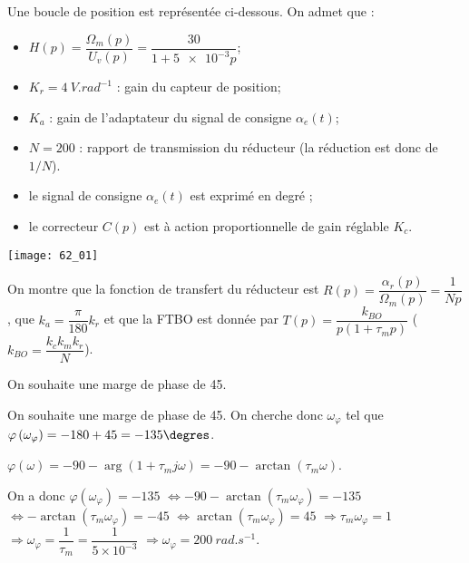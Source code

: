 \normaltrue \difficilefalse \tdifficilefalse
\correctiontrue

\setcounter{question}{0}

\ifcorrection
\else
{}
\fi


\ifprof 
\else
Une boucle de position est représentée ci-dessous. On admet que :  
\begin{itemize}
\item $H(p)=\dfrac{\Omega_m(p)}{U_v(p)}=\dfrac{30}{1+\num{5e-3}p}$;
\item $K_r = \SI{4}{V.rad^{-1}}$ : gain du capteur de position;
\item $K_a$ : gain de l’adaptateur du signal de consigne $\alpha_e(t)$; 
\item $N=200$ : rapport de transmission du réducteur (la réduction est donc de $1/N$).
\item le signal de consigne $\alpha_e(t)$ est exprimé en degré ; 
\item le correcteur $C(p)$ est à action proportionnelle de gain réglable $K_c$. 
\end{itemize}


\begin{center}
\texttt{[image: 62\_01]}
\end{center}
 \fi
 
 
 On montre que la fonction de transfert du réducteur est $R(p)=\dfrac{\alpha_r(p)}{\Omega_m(p)}=\dfrac{1}{Np}$, que  $k_a=\dfrac{\pi}{180}k_r$ et que la FTBO est donnée par $T(p)=\dfrac{k_{BO}}{p\left(1+\tau_m p\right)}$ ($k_{BO}=\dfrac{k_c k_m k_r}{N}$).
 
 
 On souhaite une marge de phase de 45\degres.
 
\ifprof
On souhaite une marge de phase de 45\degres. On cherche donc $\omega_{\varphi}$ tel que 
$\varphi\left(\omega_{\varphi}\right)=-180+45 = -135\degres$.

$\varphi(\omega)=-90-\arg\left(1+\tau_m j \omega \right) =-90-\arctan\left(\tau_m  \omega \right)  $.

On a donc $\varphi\left(\omega_{\varphi}\right)=-135$
$\Leftrightarrow -90-\arctan\left(\tau_m  \omega_{\varphi}\right)  = -135 $
$\Leftrightarrow -\arctan\left(\tau_m  \omega_{\varphi} \right)  = -45 $
$\Leftrightarrow \arctan\left(\tau_m  \omega_{\varphi} \right)  = 45 $
$\Rightarrow \tau_m  \omega_{\varphi} = 1 $
$\Rightarrow \omega_{\varphi}  = \dfrac{1}{\tau_m}= \dfrac{1}{5\times 10^{-3}}$
$\Rightarrow \omega_{\varphi}  = \SI{200}{rad.s^{-1}}$.


